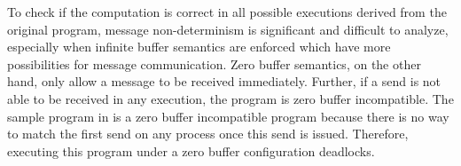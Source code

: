 To check if the computation is correct in all possible executions derived from the original program, message non-determinism is significant and difficult to analyze, especially when infinite buffer semantics are enforced which have more possibilities for message communication. Zero buffer semantics, on the other hand, only allow a message to be received immediately. Further, if a send is not able to be received in any execution, the program is zero buffer incompatible. The sample program in  is a zero buffer incompatible program because there is no way to match the first send on any process once this send is issued. Therefore, executing this program under a zero buffer configuration deadlocks. 



